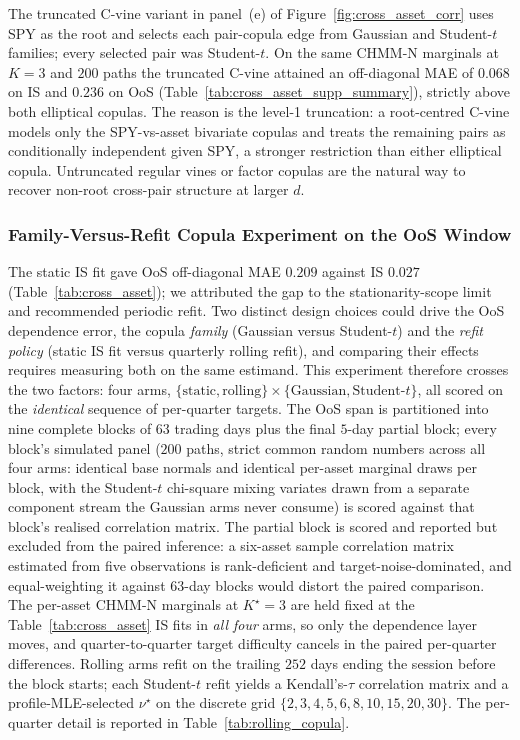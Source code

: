 The truncated C-vine variant in panel~(e) of Figure~\ref{fig:cross_asset_corr} uses SPY as the root and selects each pair-copula edge from Gaussian and Student-$t$ families; every selected pair was Student-$t$. On the same CHMM-N marginals at $K = 3$ and $200$ paths the truncated C-vine attained an off-diagonal MAE of $0.068$ on IS and $0.236$ on OoS (Table~\ref{tab:cross_asset_supp_summary}), strictly above both elliptical copulas. The reason is the level-1 truncation: a root-centred C-vine models only the SPY-vs-asset bivariate copulas and treats the remaining pairs as conditionally independent given SPY, a stronger restriction than either elliptical copula. Untruncated regular vines or factor copulas are the natural way to recover non-root cross-pair structure at larger $d$.

\subsubsection{Family-Versus-Refit Copula Experiment on the OoS Window}
\label{sec:rolling_copula_supp}

The static IS fit gave OoS off-diagonal MAE $0.209$ against IS $0.027$ (Table~\ref{tab:cross_asset}); we attributed the gap to the stationarity-scope limit and recommended periodic refit. Two distinct design choices could drive the OoS dependence error, the copula \emph{family} (Gaussian versus Student-$t$) and the \emph{refit policy} (static IS fit versus quarterly rolling refit), and comparing their effects requires measuring both on the same estimand. This experiment therefore crosses the two factors: four arms, $\{\text{static}, \text{rolling}\} \times \{\text{Gaussian}, \text{Student-}t\}$, all scored on the \emph{identical} sequence of per-quarter targets. The OoS span is partitioned into nine complete blocks of $63$ trading days plus the final $5$-day partial block; every block's simulated panel ($200$ paths, strict common random numbers across all four arms: identical base normals and identical per-asset marginal draws per block, with the Student-$t$ chi-square mixing variates drawn from a separate component stream the Gaussian arms never consume) is scored against that block's realised correlation matrix. The partial block is scored and reported but excluded from the paired inference: a six-asset sample correlation matrix estimated from five observations is rank-deficient and target-noise-dominated, and equal-weighting it against $63$-day blocks would distort the paired comparison. The per-asset CHMM-N marginals at $K^\star = 3$ are held fixed at the Table~\ref{tab:cross_asset} IS fits in \emph{all four} arms, so only the dependence layer moves, and quarter-to-quarter target difficulty cancels in the paired per-quarter differences. Rolling arms refit on the trailing $252$ days ending the session before the block starts; each Student-$t$ refit yields a Kendall's-$\tau$ correlation matrix and a profile-MLE-selected $\nu^\star$ on the discrete grid $\{2, 3, 4, 5, 6, 8, 10, 15, 20, 30\}$. The per-quarter detail is reported in Table~\ref{tab:rolling_copula}.

